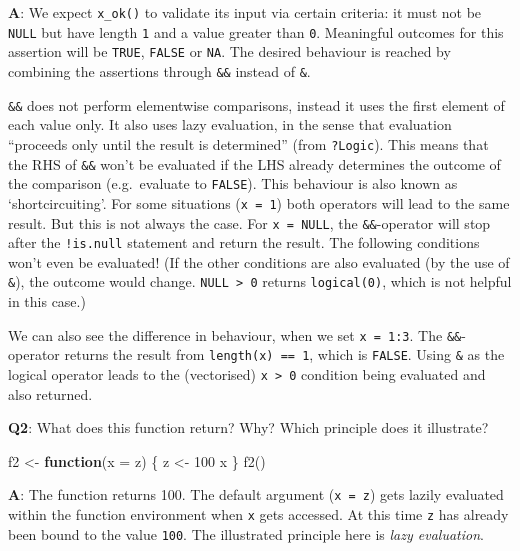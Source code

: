 \documentclass[
]{krantz}
\makeatletter
\newenvironment{Shaded}{\begin{snugshade}}{\end{snugshade}}
\newcommand{\ControlFlowTok}[1]{\textcolor[rgb]{0.13,0.29,0.53}{\textbf{#1}}}
\newcommand{\DataTypeTok}[1]{\textcolor[rgb]{0.13,0.29,0.53}{#1}}
\newcommand{\DecValTok}[1]{\textcolor[rgb]{0.00,0.00,0.81}{#1}}
\newcommand{\KeywordTok}[1]{\textcolor[rgb]{0.13,0.29,0.53}{\textbf{#1}}}
\newcommand{\NormalTok}[1]{#1}
\newcommand{\StringTok}[1]{\textcolor[rgb]{0.31,0.60,0.02}{#1}}
\newenvironment{kframe}{%
\medskip{}
\setlength{\fboxsep}{.8em}
 \def\at@end@of@kframe{}%
 \ifinner\ifhmode%
  \def\at@end@of@kframe{\end{minipage}}%
  \begin{minipage}{\columnwidth}%
 \fi\fi%
 \def\FrameCommand##1{\hskip\@totalleftmargin \hskip-\fboxsep
 \colorbox{shadecolor}{##1}\hskip-\fboxsep
     \hskip-\linewidth \hskip-\@totalleftmargin \hskip\columnwidth}%
 \MakeFramed {\advance\hsize-\width
   \@totalleftmargin\z@ \linewidth\hsize
   \@setminipage}}%
 {\par\unskip\endMakeFramed%
 \at@end@of@kframe}
\renewenvironment{Shaded}{\begin{kframe}}{\end{kframe}}
\renewcommand{\KeywordTok} [1]{\textcolor[rgb]{0.00,0.44,0.13}{{#1}}}
\renewcommand{\DataTypeTok}[1]{\textcolor[rgb]{0.56,0.13,0.00}{{#1}}}
\renewcommand{\DecValTok}  [1]{\textcolor[rgb]{0.25,0.63,0.44}{{#1}}}
\renewcommand{\StringTok}  [1]{\textcolor[rgb]{0.25,0.44,0.63}{{#1}}}
\renewcommand{\NormalTok}  [1]{{#1}}
\makeatother
\begin{document}
\textbf{{A}}: We expect \texttt{x\_ok()} to validate its input via certain criteria: it must not be \texttt{NULL} but have length \texttt{1} and a value greater than \texttt{0}. Meaningful outcomes for this assertion will be \texttt{TRUE}, \texttt{FALSE} or \texttt{NA}. The desired behaviour is reached by combining the assertions through \texttt{\&\&} instead of \texttt{\&}.

\texttt{\&\&} does not perform elementwise comparisons, instead it uses the first element of each value only. It also uses lazy evaluation, in the sense that evaluation ``proceeds only until the result is determined'' (from \texttt{?Logic}). This means that the RHS of \texttt{\&\&} won't be evaluated if the LHS already determines the outcome of the comparison (e.g.~evaluate to \texttt{FALSE}). This behaviour is also known as `shortcircuiting'.
For some situations (\texttt{x\ =\ 1}) both operators will lead to the same result. But this is not always the case. For \texttt{x\ =\ NULL}, the \texttt{\&\&}-operator will stop after the \texttt{!is.null} statement and return the result. The following conditions won't even be evaluated! (If the other conditions are also evaluated (by the use of \texttt{\&}), the outcome would change. \texttt{NULL\ \textgreater{}\ 0} returns \texttt{logical(0)}, which is not helpful in this case.)

We can also see the difference in behaviour, when we set \texttt{x\ =\ 1:3}. The \texttt{\&\&}-operator returns the result from \texttt{length(x)\ ==\ 1}, which is \texttt{FALSE}. Using \texttt{\&} as the logical operator leads to the (vectorised) \texttt{x\ \textgreater{}\ 0} condition being evaluated and also returned.

\textbf{{Q2}}: What does this function return? Why? Which principle does it illustrate?

\begin{Shaded}
\begin{Highlighting}[]
\NormalTok{f2 <-}\StringTok{ }\ControlFlowTok{function}\NormalTok{(}\DataTypeTok{x =}\NormalTok{ z) \{}
\NormalTok{  z <-}\StringTok{ }\DecValTok{100}
\NormalTok{  x}
\NormalTok{\}}
\KeywordTok{f2}\NormalTok{()}
\end{Highlighting}
\end{Shaded}

\textbf{{A}}: The function returns 100. The default argument (\texttt{x\ =\ z}) gets lazily evaluated within the function environment when \texttt{x} gets accessed. At this time \texttt{z} has already been bound to the value \texttt{100}. The illustrated principle here is \emph{lazy evaluation}.
\end{document}
